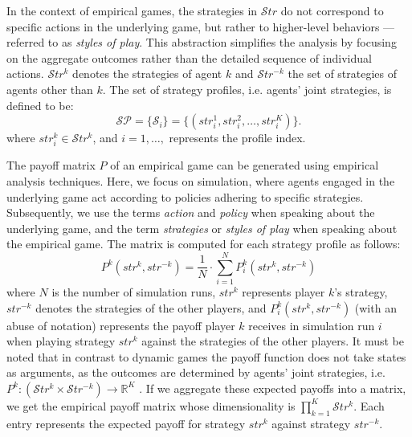         \noindent
        In the context of empirical games, the strategies in $\mathcal{S}tr$ do not correspond to specific actions in the underlying game, but rather to higher-level behaviors —referred to as \emph{styles of play}. This abstraction simplifies the analysis by focusing on the aggregate outcomes rather than the detailed sequence of individual actions. $\mathcal{S}tr^k$ denotes the strategies of agent $k$ and $\mathcal{S}tr^{-k}$ the set of strategies of agents other than $k$. The set of strategy profiles, i.e. agents' joint strategies, is defined to be:
        \begin{equation}
            \mathcal{SP} = \{\mathcal{S}_i\} = \{(str_i^1, str_i^2, \dots, str_i^K)\}.
            \label{eq:strategy_profiles}
        \end{equation}
        where $str_i^k \in \mathcal{S}tr^k$, and $i = 1, \dots,$ represents the profile index.\tinydouble
        
        \noindent
        The payoff matrix $P$ of an empirical game can be generated using empirical analysis techniques. Here, we focus on simulation, where agents engaged in the underlying game act according to policies adhering to specific strategies. Subsequently, we use the terms \emph{action} and \emph{policy} when speaking about the underlying game, and the term \emph{strategies} or \emph{styles of play} when speaking about the empirical game. The matrix is computed for each strategy profile as follows:
        \begin{equation}
            P^k(str^k, str^{-k}) =\frac{1}{N} \cdot \sum_{i=1}^{N} P^k_{i}(str^k, str^{-k})
            \label{eq:meta_payoff}
        \end{equation}
        where $N$ is the number of simulation runs, $str^k$ represents player $k$'s strategy, $str^{-k}$ denotes the strategies of the other players, and $P^k_{i}(str^k, str^{-k})$ (with an abuse of notation) represents the payoff player $k$ receives in simulation run $i$ when playing strategy $str^k$ against the strategies of the other players. It must be noted that in contrast to dynamic games the payoff function does not take states as arguments, as the outcomes are determined by agents' joint strategies, i.e. $P^k: (\mathcal{S}tr^k \times \mathcal{S}tr^{-k}) \to \mathbb{R}^K$ \cite{omidshafiei2019alpharank}. If we aggregate these expected payoffs into a matrix, we get the empirical payoff matrix whose dimensionality is $\prod_{k=1}^K\mathcal{S}tr^k$. Each entry represents the expected payoff for strategy $str^k$ against strategy $str^{-k}$.